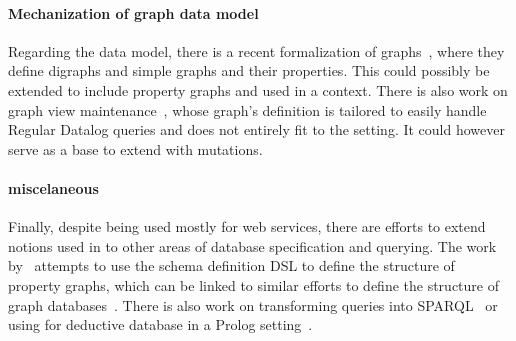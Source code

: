 \paragraph{Mechanization of graph data model} Regarding the data model, there is a recent formalization of graphs~\cite{graphtheory}, where they define digraphs and simple graphs and their properties.
This could possibly be extended to include property graphs and used in a \gcoql context.
There is also work on graph view maintenance~\cite{graphviewmaint}, whose graph's definition is tailored to easily handle Regular Datalog queries and does not entirely fit to the \gql setting.
It could however serve as a base to extend \gcoql with mutations. 

\paragraph{\gql miscelaneous} Finally, despite being used mostly for web services, there are efforts to extend notions used in \gql to other areas of database specification and querying. 
The work by~\cite{olafschema} attempts to use the schema definition DSL to define the structure of property graphs,
which can be linked to similar efforts to define the structure of graph databases~\cite{schemaval}. There is also work on transforming \gql queries into SPARQL~\cite{gqlsparql} or using \gql for deductive database in a Prolog setting~\cite{gqldeductive}. 

